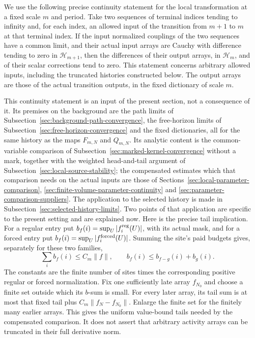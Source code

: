 We use the following precise continuity statement for the local
transformation at a fixed scale $m$ and period. Take two sequences of
terminal indices tending to infinity and, for each index, an allowed
input of the transition from $m+1$ to $m$ at that terminal index.
If the input normalized couplings of the two sequences have a common
limit, and their actual input arrays are Cauchy with difference
tending to zero in $\mathcal H_{m+1}$, then the differences of their
output arrays, in $\mathcal H_m$, and of their scalar corrections
tend to zero. This statement concerns arbitrary allowed inputs,
including the truncated histories constructed below. The output
arrays are those of the actual transition outputs, in the fixed
dictionary of scale $m$.

This continuity statement is an input of the present section, not a
consequence of it. Its premises on the background are the path limits
of Subsection~\ref{sec:background-path-convergence}, the free-horizon
limits of Subsection~\ref{sec:free-horizon-convergence} and the fixed
dictionaries, all for the same history as the maps $F_{m,N}$ and
$Q_{m,N}$. Its analytic content is the common-variable comparison of
Subsection~\ref{sec:marked-kernel-convergence} without a mark, together
with the weighted head-and-tail argument of
Subsection~\ref{sec:local-source-stability}; the compensated estimates
which that comparison needs on the actual inputs are those of
Sections~\ref{sec:local-parameter-comparison},
\ref{sec:finite-volume-parameter-continuity} and
\ref{sec:parameter-comparison-suppliers}. The application to the
selected history is made in Subsection~\ref{sec:selected-history-limits}.
Two points of that application are specific to the present setting
and are explained now. Here is the precise tail implication. For a
regular entry put
$b_f(i)=\sup_U|f_i^{\rm reg}(U)|$, with its actual mask, and for
a forced entry put $b_f(i)=\sup_U|f_i^{\rm forced}(U)|$.
Summing the site's paid budgets gives, separately for these two
families,
\[
 \sum_i b_f(i)\le C_m\|f\|,\qquad
 b_f(i)\le b_{f-g}(i)+b_g(i).
\]
The constants are the finite number of sites times the corresponding
positive regular or forced normalization. Fix one sufficiently late
array $f_{N_0}$ and choose a finite set outside which its $b$-sum
is small. For every later array, its tail sum is at most that fixed
tail plus $C_m\|f_N-f_{N_0}\|$. Enlarge the finite set for the
finitely many earlier arrays. This gives the uniform value-bound
tails needed by the compensated comparison. It does not assert
that arbitrary activity arrays can be truncated in their full
derivative norm.

